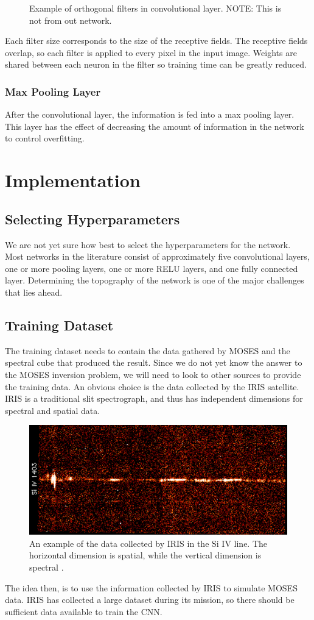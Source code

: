 \documentclass[twoside]{article}
\begin{document}
\begin{multicols}{2}
\begin{figure}[H]
    \caption{Example of orthogonal filters in convolutional layer. NOTE: This is not from out network.}
    \label{ortho}
\end{figure}
Each filter size corresponds to the size of the receptive fields. The receptive fields overlap, so each filter is applied to every pixel in the input image. Weights are shared between each neuron in the filter so training time can be greatly reduced.

\subsubsection{Max Pooling Layer}
After the convolutional layer, the information is fed into a max pooling layer. This layer has the effect of decreasing the amount of information in the network to control overfitting. 


\section{Implementation}
\subsection{Selecting Hyperparameters}
We are not yet sure how best to select the hyperparameters for the network. Most networks in the literature consist of approximately five convolutional layers, one or more pooling layers, one or more RELU layers, and one fully connected layer. Determining the topography of the network is one of the major challenges that lies ahead.
\subsection{Training Dataset}
The training dataset needs to contain the data gathered by MOSES and the spectral cube that produced the result. Since we do not yet know the answer to the MOSES inversion problem, we will need to look to other sources to provide the training data. An obvious choice is the data collected by the IRIS satellite. IRIS is a traditional slit spectrograph, and thus has independent dimensions for spectral and spatial data. 
\begin{figure}[H]
	\centering
	\includegraphics[width=\linewidth]{images/iris}
	\caption{An example of the data collected by IRIS in the Si IV line. The horizontal dimension is spatial, while the vertical dimension is spectral \cite{iris}.}
\end{figure}
The idea then, is to use the information collected by IRIS to simulate MOSES data. IRIS has collected a large dataset during its mission, so there should be sufficient data available to train the CNN.

\end{multicols}
\end{document}
